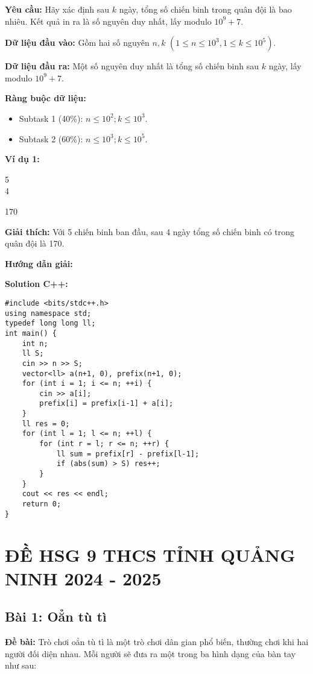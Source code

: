 \documentclass[12pt]{scrartcl}  %
\begin{document}
\textbf{Yêu cầu:}
Hãy xác định sau $k$ ngày, tổng số chiến binh trong quân đội là bao nhiêu.
Kết quả in ra là số nguyên duy nhất, lấy modulo $10^9 + 7$.

\textbf{Dữ liệu đầu vào:}
Gồm hai số nguyên $n, k$ $(1 \leq n \leq 10^3, 1 \leq k \leq 10^5)$.

\textbf{Dữ liệu đầu ra:}
Một số nguyên duy nhất là tổng số chiến binh sau $k$ ngày, lấy modulo $10^9 + 7$.

\textbf{Ràng buộc dữ liệu:}
\begin{itemize}
    \item Subtask 1 (40\%): $n \leq 10^2; k \leq 10^3$.
    \item Subtask 2 (60\%): $n \leq 10^3; k \leq 10^5$.
\end{itemize}

\textbf{Ví dụ 1:}
\begin{tcolorbox}[colback=gray!5!white, colframe=blue!50!black, title=Input]
5\\
4
\end{tcolorbox}
\begin{tcolorbox}[colback=gray!5!white, colframe=green!50!black, title=Output]
170
\end{tcolorbox}

\textbf{Giải thích:}
Với 5 chiến binh ban đầu, sau 4 ngày tổng
số chiến binh có trong quân đội là 170.

\textbf{Hướng dẫn giải:}

\textbf{Solution C++:}
\begin{lstlisting}
#include <bits/stdc++.h>
using namespace std;
typedef long long ll;
int main() {
    int n;
    ll S;
    cin >> n >> S;
    vector<ll> a(n+1, 0), prefix(n+1, 0);
    for (int i = 1; i <= n; ++i) {
        cin >> a[i];
        prefix[i] = prefix[i-1] + a[i];
    }
    ll res = 0;
    for (int l = 1; l <= n; ++l) {
        for (int r = l; r <= n; ++r) {
            ll sum = prefix[r] - prefix[l-1];
            if (abs(sum) > S) res++;
        }
    }
    cout << res << endl;
    return 0;
}
\end{lstlisting}

\section{ĐỀ HSG 9 THCS TỈNH QUẢNG NINH 2024 - 2025}

\subsection{Bài 1: Oẳn tù tì}
\textbf{Đề bài:}
Trò chơi oẳn tù tì là một trò chơi dân gian phổ biến, thường chơi khi hai người đối diện nhau. Mỗi người sẽ đưa ra một trong ba hình dạng của bàn tay như sau:
\end{document}
